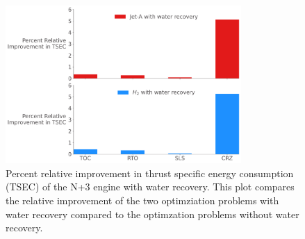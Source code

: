 \documentclass[conf]{new-aiaa}
\begin{document}

\begin{figure}[hbt!]
    \centering
    \includegraphics[width=0.8\textwidth]{JetA-H2_TSEC_diff.pdf}
    \caption{Percent relative improvement in thrust specific energy consumption (TSEC) of the N+3 engine with water recovery.
        This plot compares the relative improvement of the two optimziation problems with water recovery compared to the optimzation problems without water recovery.}
    \label{fig:barchart}
\end{figure}
\end{document}
